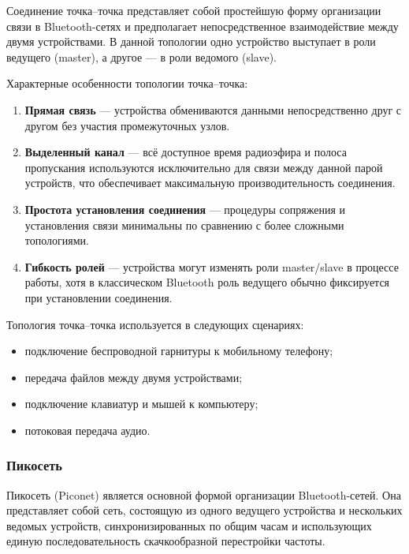 Соединение точка--точка представляет собой простейшую форму организации связи в Bluetooth-сетях и предполагает непосредственное взаимодействие между двумя устройствами. В данной топологии одно устройство выступает в роли ведущего (master), а другое --- в роли ведомого (slave).

Характерные особенности топологии точка--точка:
\begin{enumerate}[nosep]
    \item \textbf{Прямая связь} --- устройства обмениваются данными непосредственно друг с другом без участия промежуточных узлов.

    \item \textbf{Выделенный канал} --- всё доступное время радиоэфира и полоса пропускания используются исключительно для связи между данной парой устройств, что обеспечивает максимальную производительность соединения.

    \item \textbf{Простота установления соединения} --- процедуры сопряжения и установления связи минимальны по сравнению с более сложными топологиями.

    \item \textbf{Гибкость ролей} --- устройства могут изменять роли master/slave в процессе работы, хотя в классическом Bluetooth роль ведущего обычно фиксируется при установлении соединения.
\end{enumerate}

Топология точка--точка используется в следующих сценариях:
\begin{itemize}[nosep]
    \item подключение беспроводной гарнитуры к мобильному телефону;
    \item передача файлов между двумя устройствами;
    \item подключение клавиатур и мышей к компьютеру;
    \item потоковая передача аудио.
\end{itemize}

\subsubsection{Пикосеть}

Пикосеть (Piconet) является основной формой организации Bluetooth-сетей. Она представляет собой сеть, состоящую из одного ведущего устройства и нескольких ведомых устройств, синхронизированных по общим часам и использующих единую последовательность скачкообразной перестройки частоты.

